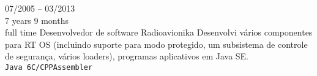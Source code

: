 \begin{entrylist}
    \entry
    {07/2005 -- 03/2013\\\footnotesize{7 years 9 months\\full time}}
    {Desenvolvedor de software}
    {Radioavionika}
    {
        Desenvolvi vários componentes para RT OS (incluindo suporte para modo protegido, um subsistema de controle de segurança, vários loaders), programas aplicativos em Java SE. \\
    \texttt{Java 6}\slashsep\texttt{C/CPP}\slashsep\texttt{Assembler}}

\end{entrylist}

